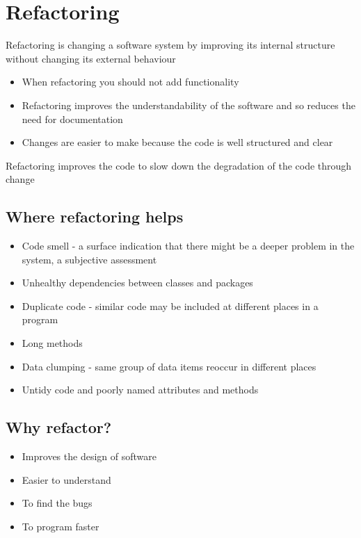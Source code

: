 \documentclass{article}[18pt]
\begin{document}
\section{Refactoring}
Refactoring is changing a software system by improving its internal structure without changing its external behaviour
\begin{itemize}
	\item When refactoring you should not add functionality
	\item Refactoring improves the understandability of the software and so reduces the need for documentation
	\item Changes are easier to make because the code is well structured and clear
\end{itemize}
Refactoring improves the code to slow down the degradation of the code through change
\subsection{Where refactoring helps}
\begin{itemize}
	\item Code smell - a surface indication that there might be a deeper problem in the system, a subjective assessment
	\item Unhealthy dependencies between classes and packages
	\item Duplicate code - similar code may be included at different places in a program
	\item Long methods
	\item Data clumping - same group of data items reoccur in different places
	\item Untidy code and poorly named attributes and methods
\end{itemize}
\subsection{Why refactor?}
\begin{itemize}
	\item Improves the design of software
	\item Easier to understand
	\item To find the bugs
	\item To program faster
\end{itemize}
\end{document}
